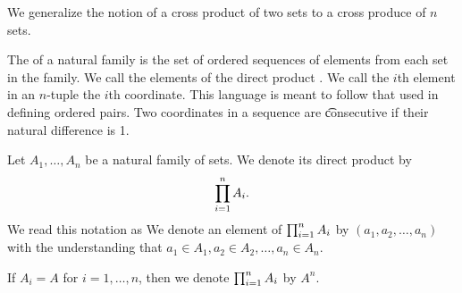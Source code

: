 
\sbasic






















\sstart
{}


We generalize the notion of a cross product of two sets to a cross produce of $n$ sets.


The  of a natural family is the set of ordered sequences of elements from each set in the family.
We call the elements of the direct product .
We call the $i$th element in an $n$-tuple the $i$th coordinate.
This language is meant to follow that used in defining ordered pairs.
Two coordinates in a sequence are \t{consecutive} if their natural difference is 1.


Let $A_1, \dots, A_n$ be a natural family
of sets. We denote its direct product by
\[
  \prod_{i = 1}^{n} A_{i}.
\]
We read this notation as 
We denote an element of $\prod_{i = 1}^{n} A_{i}$ by $(a_1, a_2, \dots, a_n)$ with the understanding that $a_1 \in A_1, a_2 \in A_2, \dots, a_n \in A_n$.

If $A_i = A$ for $i = 1, \dots, n$, then we denote
$\prod_{i = 1}^{n} A_{i}$ by $A^n$.


\strats
\strats
